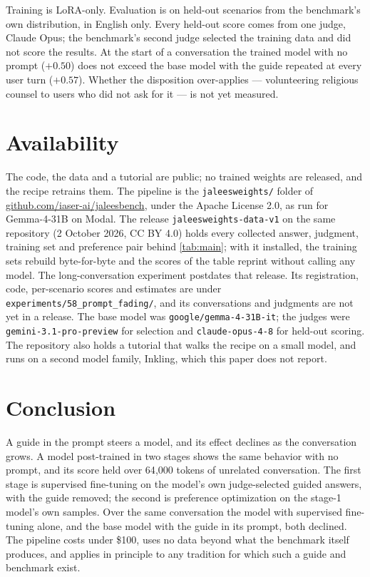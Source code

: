 \documentclass[11pt]{article}
\begin{document}
Training is LoRA-only. Evaluation is on held-out scenarios from the
benchmark's own distribution, in English only. Every held-out score
comes from one judge, Claude Opus; the benchmark's second judge
selected the training data and did not score the results. At the start
of a conversation the trained model with no prompt ($+0.50$) does not
exceed the base model with the guide repeated at every user turn
($+0.57$). Whether the disposition over-applies --- volunteering
religious counsel to users who did not ask for it --- is not yet
measured.


\section{Availability}\label{sec:availability}

The code, the data and a tutorial are public; no trained weights are
released, and the recipe retrains them. The pipeline is the
\texttt{jaleesweights/} folder of
\href{https://github.com/iaser-ai/jaleesbench}{github.com/iaser-ai/jaleesbench},
under the Apache License 2.0, as run for Gemma-4-31B on Modal. The
release \texttt{jaleesweights-data-v1} on the same repository
(2 October 2026, CC BY 4.0) holds every collected answer, judgment,
training set and preference pair behind \cref{tab:main}; with it
installed, the training sets rebuild byte-for-byte and the scores of
the table reprint without calling any model. The long-conversation
experiment postdates that release. Its registration, code,
per-scenario scores and estimates are under
\texttt{experiments/58\_prompt\_fading/}, and its conversations and
judgments are not yet in a release. The base model was
\texttt{google/gemma-4-31B-it}; the judges were
\texttt{gemini-3.1-pro-preview} for selection and
\texttt{claude-opus-4-8} for held-out scoring. The repository also
holds a tutorial that walks the recipe on a small model, and runs on a
second model family, Inkling, which this paper does not report.

\section{Conclusion}\label{sec:conclusion}

A guide in the prompt steers a model, and its effect declines as the
conversation grows. A model post-trained in two stages shows the same
behavior with no prompt, and its score held over 64{,}000 tokens of
unrelated conversation. The first stage is supervised fine-tuning on
the model's own judge-selected guided answers, with the guide removed;
the second is preference optimization on the stage-1 model's own
samples. Over the same conversation the model with supervised
fine-tuning alone, and the base model with the guide in its prompt,
both declined.
The pipeline costs under \$100, uses no data beyond what the benchmark
itself produces, and applies in principle to any tradition for which
such a guide and benchmark exist.
\end{document}

